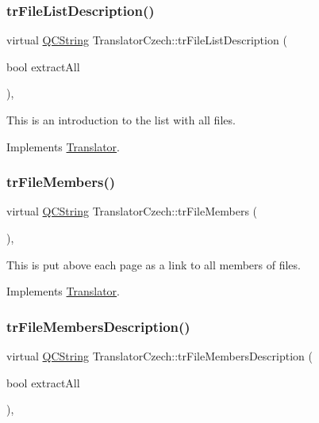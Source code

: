 \subsubsection{\texorpdfstring{trFileListDescription()}{trFileListDescription()}}
{\footnotesize\ttfamily virtual \mbox{\hyperlink{class_q_c_string}{Q\+C\+String}} Translator\+Czech\+::tr\+File\+List\+Description (\begin{DoxyParamCaption}\item[{bool}]{extract\+All }\end{DoxyParamCaption})\hspace{0.3cm}{\ttfamily [inline]}, {\ttfamily [virtual]}}

This is an introduction to the list with all files. 

Implements \mbox{\hyperlink{class_translator}{Translator}}.

\mbox{\label{class_translator_czech_ad673cc1883dd898a14e936578b658801}} 
\subsubsection{\texorpdfstring{trFileMembers()}{trFileMembers()}}
{\footnotesize\ttfamily virtual \mbox{\hyperlink{class_q_c_string}{Q\+C\+String}} Translator\+Czech\+::tr\+File\+Members (\begin{DoxyParamCaption}{ }\end{DoxyParamCaption})\hspace{0.3cm}{\ttfamily [inline]}, {\ttfamily [virtual]}}

This is put above each page as a link to all members of files. 

Implements \mbox{\hyperlink{class_translator}{Translator}}.

\mbox{\label{class_translator_czech_a5ba6adc42bc37609f4b409fc68f8a7ba}} 
\subsubsection{\texorpdfstring{trFileMembersDescription()}{trFileMembersDescription()}}
{\footnotesize\ttfamily virtual \mbox{\hyperlink{class_q_c_string}{Q\+C\+String}} Translator\+Czech\+::tr\+File\+Members\+Description (\begin{DoxyParamCaption}\item[{bool}]{extract\+All }\end{DoxyParamCaption})\hspace{0.3cm}{\ttfamily [inline]}, {\ttfamily [virtual]}}

